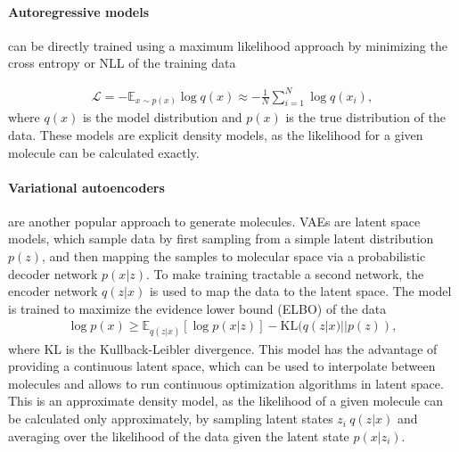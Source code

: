 \paragraph{Autoregressive models} can be directly trained using a maximum likelihood approach by minimizing
the cross entropy or \ac{NLL} of the training data

\begin{align}
      \mathcal{L} = - \mathbb{E}_{x \sim p(x)} \log q(x) \approx - \frac{1}{N} \sum_{i=1}^N \log q(x_i),
\end{align}
where $q(x)$ is the model distribution and $p(x)$ is the true distribution of the data. These models are
explicit density models, as the likelihood for a given molecule can be calculated exactly.

\paragraph{Variational autoencoders} are another popular approach to generate molecules. \Acp{VAE}
are latent space models, which sample data by first sampling from a simple latent distribution
$p(z)$, and then mapping the samples to molecular space via a probabilistic decoder network
$p(x|z)$. To make training tractable a second network, the encoder network $q(z|x)$ is used to map
the data to the latent space. The model is trained to maximize the evidence lower bound (ELBO) of
the data
\begin{align}
      \log p(x) \geq \mathbb{E}_{q(z|x)}[\log p(x|z)] - \text{KL}(q(z|x) || p(z)),
\end{align}
where KL is the Kullback-Leibler divergence. This model has the advantage of providing a continuous
latent space, which can be used to interpolate between molecules and allows to run continuous
optimization algorithms in latent space. This is an approximate density model, as the likelihood of a
given molecule can be calculated only approximately, by sampling latent states $z_i ~ q(z|x)$ and
averaging over the likelihood of the data given the latent state $p(x|z_i)$.

